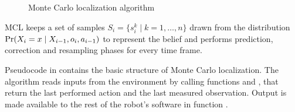 \begin{figure}[p]
\begin{algorithm}[H]

	\samples \assign \initialize{}\;
	\Forever{}{
		\samples \assign \predict{\samples, \getAction{}}\;
		\weights \assign \correct{\samples, \getObservation{}}\;
		\samples \assign \resample{\samples, \weights}\;
		\BlankLine
		\outputPosition{\samples}
	}

	\BlankLine
	\BlankLine
	\BlankLine

	\BlankLine
	\BlankLine
	\BlankLine

	\BlankLine
	\BlankLine
	\BlankLine
\end{algorithm}
\caption{Monte Carlo localization algorithm}
\label{algo:mcl}
\end{figure}

MCL keeps a set of samples \(S_i = \{s^k_{i} \mid k = 1,\dotsc,n\} \) drawn from the distribution
\(\operatorname{\mathrm{Pr}}(X_i = x \mid X_{i-1}, o_i, a_{i - 1})\) to represent the belief and performs
prediction, correction and resampling phases for every time frame.

Pseudocode in  contains the basic structure of Monte Carlo localization.
The algorithm reads inputs from the environment by calling functions
\getAction{} and \getObservation{}, that return the last performed action and the
last measured observation.
Output is made available to the rest of the robot's software in function \outputPosition{}.

